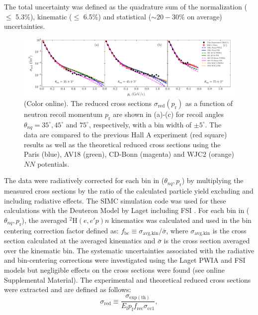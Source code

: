\documentclass[aps,prl,twocolumn,showpacs,superscriptaddress,groupedaddress]{revtex4-2}  %
\begin{document}
The total uncertainty was defined as the quadrature sum of the normalization ($\leq$ 5.3$\%$), kinematic ($\leq$ 6.5$\%$) and statistical ($\sim20-30\%$ on average) uncertainties.\\
\begin{figure}[t]
\centering        
\includegraphics[scale=0.45]{PRL_plot1.pdf}
\caption{(Color online). The reduced cross sections $\sigma_{\mathrm{red}}(p_{\mathrm{r}})$ as a function of neutron recoil momentum $p_{\mathrm{r}}$ are shown in (a)-(c) for recoil angles $\theta_{nq}=35^{\circ}, 45^{\circ}$ and $75^{\circ}$, respectively,
with a bin width of $\pm 5^{\circ}$. The data are compared to the previous Hall A experiment (red square) results \cite{PhysRevLett.107.262501} as well as the theoretical reduced cross sections using the Paris (blue),
AV18 (green), CD-Bonn (magenta) and WJC2 (orange) $NN$ potentials.}
\label{fig:fig1}
\end{figure}
\indent The data were radiatively corrected for each bin in ($\theta_{nq}, p_{\mathrm{r}}$) by multiplying the measured cross sections by the ratio of the calculated particle yield excluding and including radiative effects.
The SIMC simulation code was used for these calculations with the Deuteron Model by Laget including FSI \cite{LAGET2005}.
For each bin in ($\theta_{nq}, p_{\mathrm{r}}$), the averaged $^{2}\mathrm{H}(e,e'p)n$ kinematics was calculated and used in the bin centering correction factor defined as:
$f_{\mathrm{bc}} \equiv \sigma_{\mathrm{avg.kin}} / \bar{\sigma}$, where $\sigma_{\mathrm{avg.kin}}$ is the cross section calculated at the averaged kinematics and $\bar{\sigma}$ is the cross section averaged
over the kinematic bin. The systematic uncertainties associated with the radiative and bin-centering corrections were investigated using the Laget PWIA and FSI models but negligible effects
on the cross sections were found (see online Supplemental Material).
The experimental and theoretical reduced cross sections were extracted and are defined as follows:
\begin{equation}
\sigma_{\mathrm{red}} \equiv \frac{\sigma_{\mathrm{exp(th)}}}{E_{\mathrm{f}}p_{\mathrm{f}}f_{\mathrm{rec}}\sigma_{\mathrm{cc1}}},
\label{eq:1}
\end{equation}
\end{document}
